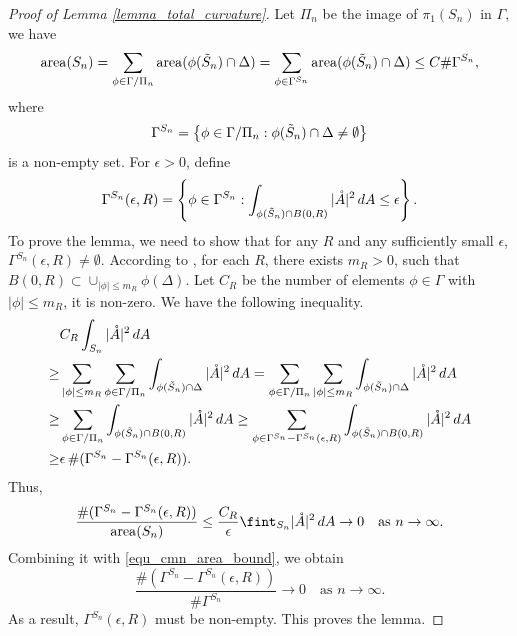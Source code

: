 \documentclass[12pt,a4paper]{amsart}
\numberwithin{equation}{section}
\theoremstyle{plain}
\theoremstyle{named}
\theoremstyle{definition}
\newcommand{\area}{{\rm{area}}}
\begin{document}
\begin{proof}[Proof of Lemma \ref{lemma_total_curvature}]
Let $\Pi_n$ be the image of $\pi_1(S_n)$ in $\Gamma$, we have \begin{equation}\label{equ_cmn_area_bound}
        \area(S_n)=\sum_{\phi\in \Gamma/\Pi_n}\area(\phi(\Tilde{S}_n)\cap \Delta)=\sum_{\phi\in \Gamma^{S_n}}\area(\phi(\Tilde{S}_n)\cap \Delta)\leq C\#\Gamma^{S_n},
    \end{equation}
where \begin{equation*}
    \Gamma^{S_n}=\left\{\phi\in\Gamma/\Pi_n: \phi(\Tilde{S}_n)\cap \Delta\neq \emptyset\right\}
\end{equation*}
is a non-empty set.
For $\epsilon>0$, define \begin{equation*}
    \Gamma^{S_n}(\epsilon,R)=\left\{\phi\in \Gamma^{S_n}: \int_{\phi(\Tilde{S}_n)\cap B(0,R)}|\mathring{A}|^2\,dA\leq \epsilon\right\}.
\end{equation*}
To prove the lemma, we need to show that for any $R$ and any sufficiently small $\epsilon$, $\Gamma^{S_n}(\epsilon,R)\neq \emptyset$.
According to \cite[Lemma 2.2]{Calegari-Marques-Neves}, for each $R$, there exists $m_R>0$, such that $B(0,R)\subset \cup_{|\phi|\leq m_R}\phi(\Delta)$. Let $C_R$ be the number of elements $\phi\in \Gamma$ with $|\phi|\leq m_R$, it is non-zero. We have the following inequality. 
\begin{align*}
    &C_R\int_{S_n}|\mathring{A}|^2\,dA\\
    \geq & \sum_{|\phi|\leq m_R}\sum_{\phi\in \Gamma/ \Pi_n}\int_{\phi(\Tilde{S}_n)\cap \Delta}|\mathring{A}|^2\,dA
    = \sum_{\phi\in \Gamma/ \Pi_n} \sum_{|\phi|\leq m_R}\int_{\phi(\Tilde{S}_n)\cap \Delta}|\mathring{A}|^2\,dA\\
    \geq & \sum_{\phi\in \Gamma/ \Pi_n}\int_{\phi(\Tilde{S}_n)\cap B(0,R)}|\mathring{A}|^2\,dA
    \geq \sum_{\phi\in \Gamma^{S_n}-\Gamma^{S_n}(\epsilon,R)}\int_{\phi(\Tilde{S}_n)\cap B(0,R)}|\mathring{A}|^2\,dA\\
    \geq  & \epsilon\, \#(\Gamma^{S_n}-\Gamma^{S_n}(\epsilon,R)).
\end{align*}
Thus, \begin{equation*}
    \frac{\#(\Gamma^{S_n}-\Gamma^{S_n}(\epsilon,R))}{\area(S_n)}\leq \frac{C_R}{\epsilon}\fint_{S_n}|\mathring{A}|^2\,dA\rightarrow 0\quad \text{as }n\rightarrow \infty.
\end{equation*}
Combining it with \eqref{equ_cmn_area_bound}, we obtain \begin{equation*}
    \frac{\#(\Gamma^{S_n}-\Gamma^{S_n}(\epsilon,R))}{\#\Gamma^{S_n}}\rightarrow 0 \quad \text{as }n\rightarrow \infty.
\end{equation*}
As a result, $\Gamma^{S_n}(\epsilon,R)$ must be non-empty. This proves the lemma.
\end{proof}
\end{document}
